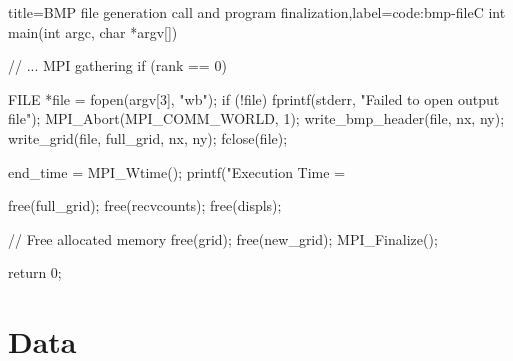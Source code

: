\documentclass[../main.tex]{subfiles}
\begin{document}
\begin{code}{title=BMP file generation call and program finalization,label=code:bmp-file}{C}
    int main(int argc, char *argv[]) {
        // ... MPI gathering
        if (rank == 0)
        {
            FILE *file = fopen(argv[3], "wb");
            if (!file)
            {
                fprintf(stderr, "Failed to open output file\n");
                MPI_Abort(MPI_COMM_WORLD, 1);
            }
            write_bmp_header(file, nx, ny);
            write_grid(file, full_grid, nx, ny);
            fclose(file);

            end_time = MPI_Wtime();
            printf("Execution Time = %

            free(full_grid);
            free(recvcounts);
            free(displs);
        }

        // Free allocated memory
        free(grid);
        free(new_grid);
        MPI_Finalize();

        return 0;
    }
\end{code}

\section{Data}
\end{document}
